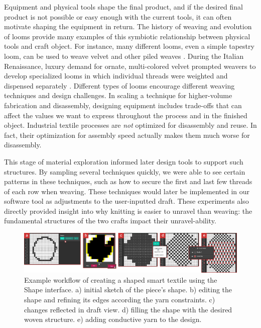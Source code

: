 Equipment and physical tools shape the final product, and if the desired final product is not possible or easy enough with the current tools, it can often motivate shaping the equipment in return. The history of weaving and evolution of looms provide many examples of this symbiotic relationship between physical tools and craft object. For instance, many different looms, even a simple tapestry loom, can be used to weave velvet and other piled weaves \cite{essen_easysupp_2016}. During the Italian Renaissance, luxury demand for ornate, multi-colored velvet prompted weavers to develop specialized looms in which individual threads were weighted and dispensed separately \cite{watt_renaissance_velvet}.
Different types of looms encourage different weaving techniques and design challenges. In scaling a technique for higher-volume fabrication and disassembly, designing equipment includes trade-offs that can affect the values we want to express throughout the process and in the finished object. Industrial textile processes are \emph{not} optimized for disassembly and reuse. In fact, their optimization for assembly speed actually makes them much worse for disassembly.

This stage of material exploration informed later design tools to support such structures. By sampling several techniques quickly, we were able to see certain patterns in these techniques, such as how to secure the first and last few threads of each row when weaving. These techniques would later be implemented in our software tool as adjustments to the user-inputted draft. These experiments also directly provided insight into why knitting is easier to unravel than weaving: the fundamental structures of the two crafts impact their unravel-ability. 

\begin{figure}[t!]
    \centering
    \includegraphics[width=\linewidth]{figs/UF_workflow.png}
    \caption[Example workflow for creating a shaped, disassemble-able woven smart textile.]{Example workflow of creating a shaped smart textile using the Shape interface. a) initial sketch of the piece's shape. b) editing the shape and refining its edges according the yarn constraints. c) changes reflected in draft view. d) filling the shape with the desired woven structure. e) adding conductive yarn to the design.}
    \label{fig:draftDesign}
\end{figure}

